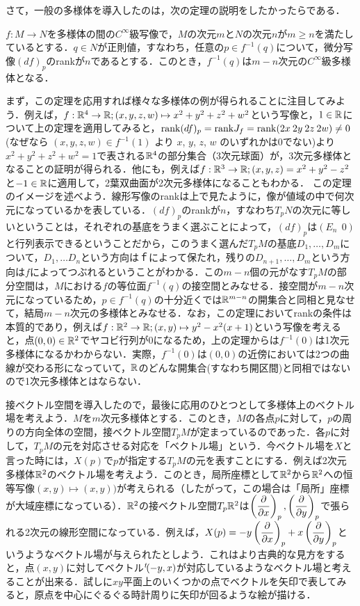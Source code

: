 さて，一般の多様体を導入したのは，次の定理の説明をしたかったらである．
\begin{s_theo}
$f:M\rightarrow N$を多様体の間の$C^\infty$級写像で，$M$の次元$m$と$N$の次元$n$が$m\ge n$を満たしているとする．$q\in N$が正則値，すなわち，任意の$p\in f^{-1}(q)$について，微分写像$(df)_p$のrankが$n$であるとする．このとき，$f^{-1}(q)$は$m-n$次元の$C^{\infty}$級多様体となる．
\end{s_theo}
まず，この定理を応用すれば様々な多様体の例が得られることに注目してみよう．例えば，$f:{\mathbb R}^4 \rightarrow {\mathbb R};(x,y,z,w)\mapsto x^2+y^2+z^2+w^2$という写像と，$1\in {\mathbb R}$について上の定理を適用してみると，${\mathrm{rank}}(df)_p={\mathrm{rank}} J_{f}={\mathrm{rank}}(2x\:2y\:2z\:2w)\neq 0$ (なぜなら $(x,y,z,w)\in f^{-1}(1)$ より $x$, $y$, $z$, $w$ のいずれかは0でない)より$x^2+y^2+z^2+w^2=1$で表される${\mathbb R}^4$の部分集合（3次元球面）が，3次元多様体となることの証明が得られる．他にも，例えば$f:{\mathbb R}^3\rightarrow {\mathbb R};(x,y,z)=x^2+y^2-z^2$と$-1\in{\mathbb R}$に適用して，2葉双曲面が2次元多様体になることもわかる．
この定理のイメージを述べよう．線形写像のrankは上で見たように，像が値域の中で何次元になっているかを表している．$(df)_p$のrankが$n$，すなわち$T_pN$の次元に等しいということは，それぞれの基底をうまく選ぶことによって，$(df)_p$は$(E_n\:\:0)$と行列表示できるということだから，このうまく選んだ$T_pM$の基底$D_1,\dots,D_m$について，$D_1,\dots D_n$という方向は$ｆ$によって保たれ，残りの$D_{n+1},\dots,D_m$という方向は$f$によってつぶれるということがわかる．この$m-n$個の元がなす$T_pM$の部分空間は，$M$における$f$の等位面$f^{-1}(q)$の接空間とみなせる．接空間が$m-n$次元になっているため，$p\in f^{-1}(q)$の十分近くでは${\mathbb R}^{m-n}$の開集合と同相と見なせて，結局$m-n$次元の多様体とみなせる．なお，この定理においてrankの条件は本質的であり，例えば$f:{\mathbb R}^2\rightarrow{\mathbb R};(x,y)\mapsto y^2-x^2(x+1)$という写像を考えると，点$(0,0)\in{\mathbb R}^2$でヤコビ行列が0になるため，上の定理からは$f^{-1}(0)$は1次元多様体になるかわからない．実際，$f^{-1}(0)$は$(0,0)$の近傍においては2つの曲線が交わる形になっていて，${\mathbb R}$のどんな開集合(すなわち開区間)と同相ではないので1次元多様体とはならない．


接ベクトル空間を導入したので，最後に応用のひとつとして多様体上のベクトル場を考えよう．$M$を$m$次元多様体とする．このとき，$M$の各点$p$に対して，$p$の周りの方向全体の空間，接ベクトル空間$T_pM$が定まっているのであった．各$p$に対して，$T_pM$の元を対応させる対応を「ベクトル場」という．今ベクトル場を$X$と言った時には，$X(p)$で$p$が指定する$T_pM$の元を表すことにする．例えば2次元多様体${\mathbb R}^2$のベクトル場を考えよう．このとき，局所座標として${\mathbb R}^2$から${\mathbb R}^2$への恒等写像$(x,y)\mapsto (x,y))$が考えられる（したがって，この場合は「局所」座標が大域座標になっている）．${\mathbb R}^2$の接ベクトル空間$T_p{\mathbb R}^2$は$\left(\displaystyle\frac{\partial}{\partial x}\right)_p,\left(\displaystyle\frac{\partial}{\partial y}\right)_p$で張られる2次元の線形空間になっている．例えば，$X(p)=-y\left(\displaystyle\frac{\partial}{\partial x}\right)_p+x\left(\displaystyle\frac{\partial}{\partial y}\right)_p$というようなベクトル場が与えられたとしよう．これはより古典的な見方をすると，点$(x,y)$に対してベクトル${}^t\!(-y,x)$が対応しているようなベクトル場と考えることが出来る．試しに$xy$平面上のいくつかの点でベクトルを矢印で表してみると，原点を中心にぐるぐる時計周りに矢印が回るような絵が描ける．


